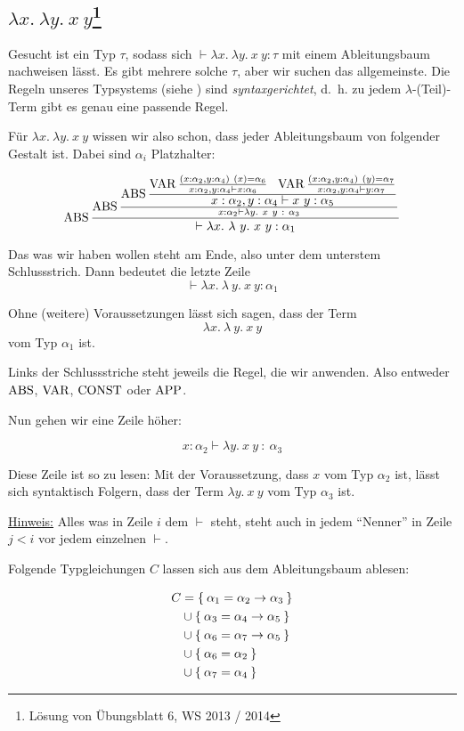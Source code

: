 \subsection[$\lambda x.\ \lambda y.\ x\ y$]{$\lambda x.\ \lambda y.\ x\ y$\footnote{Lösung von Übungsblatt 6, WS 2013 / 2014}}
Gesucht ist ein Typ $\tau$, sodass sich $\vdash \lambda x.\ \lambda y.\ x\ y: \tau$
mit einem Ableitungsbaum nachweisen lässt. Es gibt mehrere solche $\tau$, aber
wir suchen das allgemeinste. Die Regeln unseres Typsystems (siehe ) 
sind \textit{syntaxgerichtet}, d.~h. zu jedem $\lambda$-(Teil)-Term gibt es genau
eine passende Regel.

Für $\lambda x.\ \lambda y.\ x\ y$ wissen wir also schon, dass jeder Ableitungsbaum
von folgender Gestalt ist. Dabei sind $\alpha_i$ Platzhalter:

\[\ABS \frac{\ABS\frac{\textstyle\ABS \frac{\textstyle\VAR \frac{(x: \alpha_2, y: \alpha_4)\ (x) = \alpha_6}{x: \alpha_2, y: \alpha_4 \vdash x: \alpha_6}\ \ \VAR \frac{(x:\alpha_2, y: \alpha_4)\ (y) = \alpha_7}{x: \alpha_2, y: \alpha_4 \vdash y : \alpha_7}}{\textstyle x: \alpha_2, y: \alpha_4 \vdash x\ y: \alpha_5}}{x:\alpha_2 \vdash \lambda y.\ x\ y\ :\ \alpha_3}}{\vdash \lambda x.\ \lambda \ y.\ x\ y: \alpha_1}\]

Das was wir haben wollen steht am Ende, also unter dem unterstem Schlussstrich.
Dann bedeutet die letzte Zeile 
\[\vdash \lambda x.\ \lambda \ y.\ x\ y: \alpha_1\]

Ohne (weitere) Voraussetzungen lässt sich sagen, dass der Term
\[\lambda x.\ \lambda \ y.\ x\ y\]
vom Typ $\alpha_1$ ist.

Links der Schlussstriche steht jeweils die Regel, die wir anwenden. Also entweder
$\operatorname{ABS}$, $\operatorname{VAR}$, $\operatorname{CONST}$ oder $\operatorname{APP}$.

Nun gehen wir eine Zeile höher:

\[x:\alpha_2 \vdash \lambda y.\ x\ y\ :\ \alpha_3\]

Diese Zeile ist so zu lesen: Mit der Voraussetzung, dass $x$ vom Typ $\alpha_2$
ist, lässt sich syntaktisch Folgern, dass der Term $\lambda y.\ x\ y$ vom
Typ $\alpha_3$ ist.

\underline{Hinweis:} Alles was in Zeile $i$ dem $\vdash$ steht, steht auch in 
jedem \enquote{Nenner} in Zeile $j < i$ vor jedem einzelnen $\vdash$.

Folgende Typgleichungen $C$ lassen sich aus dem Ableitungsbaum ablesen:

\begin{align*}
	C &= \Set{\alpha_1 = \alpha_2 \rightarrow \alpha_3}\\
	  &\cup \Set{\alpha_3 = \alpha_4 \rightarrow \alpha_5}\\
	  &\cup \Set{\alpha_6 = \alpha_7 \rightarrow \alpha_5}\\
	  &\cup \Set{\alpha_6 = \alpha_2}\\
	  &\cup \Set{\alpha_7 = \alpha_4}
\end{align*}

